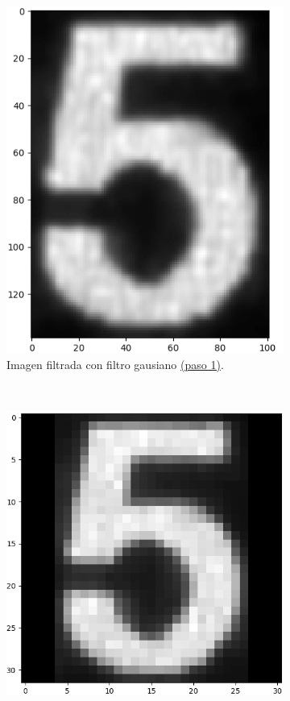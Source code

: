 \begin{figure}[hb!]
\begin{subfigure}[t]{0.48\textwidth}
        \includegraphics[height=\x1cm]{3_Reconocimiento/Figs/train_sample5_filtered}
        \caption{Imagen filtrada con filtro gausiano \hyperref[sec:gaussian_filter]{(paso 1)}.}
    \end{subfigure}
    \\[+1em]
    \begin{subfigure}[t]{0.48\textwidth}
        \centering
        \includegraphics[height=\x1cm]{3_Reconocimiento/Figs/train_sample5_padded}

\end{subfigure}
\end{figure}
